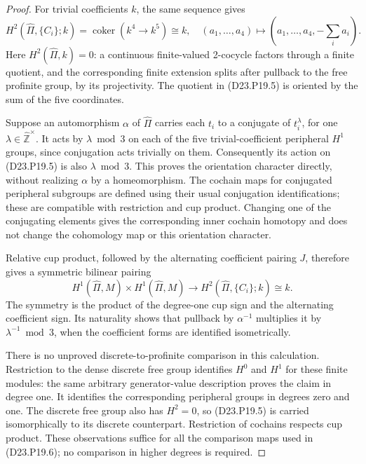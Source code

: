 \begin{proof}
For trivial coefficients $k$, the same sequence gives
\[
 H^2(\widehat\Pi,\{C_i\};k)
   =\operatorname{coker}\left(
       k^4\longrightarrow k^5\right)\cong k,
 \quad
 (a_1,\ldots,a_4)\longmapsto
       (a_1,\ldots,a_4,-\textstyle\sum_i a_i).              \tag{D23.P19.5}
\]
Here $H^2(\widehat\Pi,k)=0$: a continuous finite-valued
2-cocycle factors through a finite quotient, and the
corresponding finite extension splits after pullback to the
free profinite group, by its projectivity. The quotient in
(D23.P19.5) is oriented by the sum of the five coordinates.

Suppose an automorphism $\alpha$ of $\widehat\Pi$ carries
each $t_i$ to a conjugate of $t_i^\lambda$, for one
$\lambda\in\widehat{\mathbb Z}^{\times}$. It acts by
$\lambda\bmod3$ on each of the five trivial-coefficient
peripheral $H^1$ groups, since conjugation acts trivially on
them. Consequently its action on (D23.P19.5) is also
$\lambda\bmod3$. This proves the orientation character
directly, without realizing $\alpha$ by a homeomorphism.
The cochain maps for conjugated peripheral subgroups are
defined using their usual conjugation identifications; these
are compatible with restriction and cup product. Changing
one of the conjugating elements gives the corresponding
inner cochain homotopy and does not change the cohomology
map or this orientation character.

Relative cup product, followed by the alternating coefficient
pairing $J$, therefore gives a symmetric bilinear pairing
\[
 H^1(\widehat\Pi,M)\times H^1(\widehat\Pi,M)
       \longrightarrow H^2(\widehat\Pi,\{C_i\};k)\cong k.
 \tag{D23.P19.6}
\]
The symmetry is the product of the degree-one cup sign and
the alternating coefficient sign. Its naturality shows that
pullback by $\alpha^{-1}$ multiplies it by
$\lambda^{-1}\bmod3$, when the coefficient forms are
identified isometrically.

There is no unproved discrete-to-profinite comparison in
this calculation. Restriction to the dense discrete free
group identifies $H^0$ and $H^1$ for these finite modules:
the same arbitrary generator-value description proves the
claim in degree one. It identifies the corresponding
peripheral groups in degrees zero and one. The discrete
free group also has $H^2=0$, so (D23.P19.5) is carried
isomorphically to its discrete counterpart. Restriction of
cochains respects cup product. These observations suffice
for all the comparison maps used in (D23.P19.6); no
comparison in higher degrees is required.


\end{proof}
